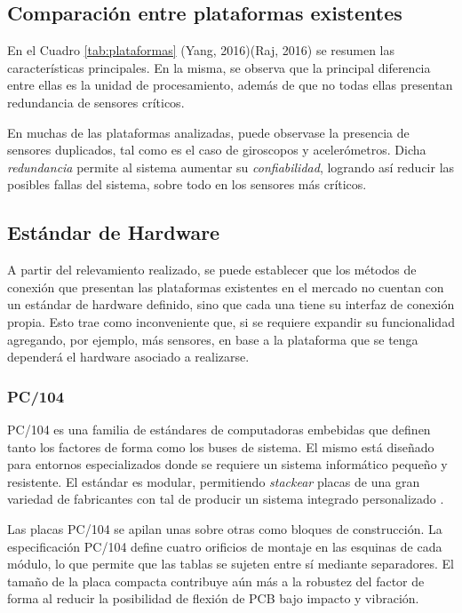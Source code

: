\subsection{Comparación entre plataformas existentes}


En el Cuadro \ref{tab:plataformas} (Yang, 2016)(Raj, 2016) se resumen las características principales. En la misma, se observa que la principal diferencia entre ellas es la unidad de procesamiento, además de que no todas ellas presentan redundancia de sensores críticos.



En muchas de las plataformas analizadas, puede observase la presencia de sensores duplicados, tal como es el caso de giroscopos y acelerómetros. Dicha \textit{redundancia} permite al sistema aumentar su \textit{confiabilidad}, logrando así reducir las posibles fallas del sistema, sobre todo en los sensores más críticos.
\begin{large}
\end{large}
\subsection{Estándar de Hardware}

A partir del relevamiento realizado, se puede establecer que los métodos de conexión que presentan las plataformas existentes en el mercado no cuentan con un estándar de hardware definido, sino que cada una tiene su interfaz de conexión propia. Esto trae como inconveniente que, si se requiere expandir su funcionalidad agregando, por ejemplo, más sensores, en base a la plataforma que se tenga dependerá el hardware asociado a realizarse.

\subsubsection{PC/104}
PC/104 es una familia de estándares de computadoras embebidas que definen tanto los factores de forma como los buses de sistema. El mismo está diseñado para entornos especializados donde se requiere un sistema informático pequeño y resistente. El estándar es modular, permitiendo \textit{stackear} placas de una gran variedad de fabricantes con tal de producir un sistema integrado personalizado \cite{pc104}.

Las placas PC/104 se apilan unas sobre otras como bloques de construcción. La especificación PC/104 define cuatro orificios de montaje en las esquinas de cada módulo, lo que permite que las tablas se sujeten entre sí mediante separadores. El tamaño de la placa compacta contribuye aún más a la robustez del factor de forma al reducir la posibilidad de flexión de PCB bajo impacto y vibración.

